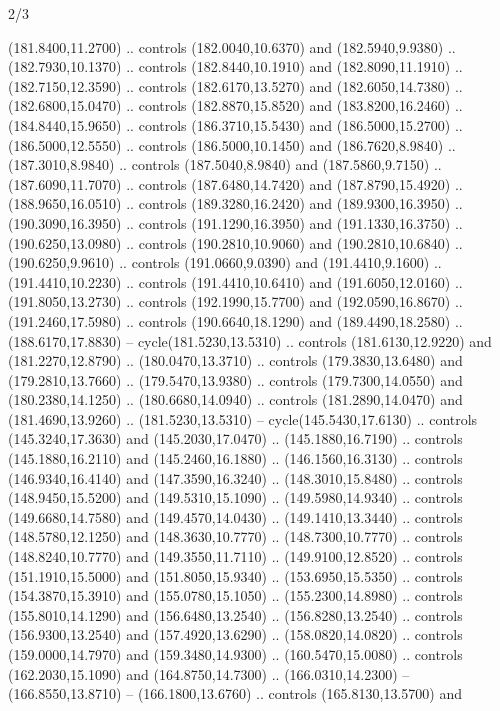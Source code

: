 \begin{flagdescription}{2/3}
\begin{scope}[xshift=0.5\flaglength,yshift=0.5\flagwidth,scale=\stretchfactor]
\begin{scope}[scale=0.001645\flagwidth,yshift=65mm,xshift=-63mm]
\begin{scope}[y=0.80pt, x=0.80pt, yscale=-1,]
\begin{scope}[cm={{1.33333,0.0,0.0,1.33333,(0.0,1e-05)}}]
  (181.8400,11.2700) .. controls (182.0040,10.6370) and (182.5940,9.9380) ..
  (182.7930,10.1370) .. controls (182.8440,10.1910) and (182.8090,11.1910) ..
  (182.7150,12.3590) .. controls (182.6170,13.5270) and (182.6050,14.7380) ..
  (182.6800,15.0470) .. controls (182.8870,15.8520) and (183.8200,16.2460) ..
  (184.8440,15.9650) .. controls (186.3710,15.5430) and (186.5000,15.2700) ..
  (186.5000,12.5550) .. controls (186.5000,10.1450) and (186.7620,8.9840) ..
  (187.3010,8.9840) .. controls (187.5040,8.9840) and (187.5860,9.7150) ..
  (187.6090,11.7070) .. controls (187.6480,14.7420) and (187.8790,15.4920) ..
  (188.9650,16.0510) .. controls (189.3280,16.2420) and (189.9300,16.3950) ..
  (190.3090,16.3950) .. controls (191.1290,16.3950) and (191.1330,16.3750) ..
  (190.6250,13.0980) .. controls (190.2810,10.9060) and (190.2810,10.6840) ..
  (190.6250,9.9610) .. controls (191.0660,9.0390) and (191.4410,9.1600) ..
  (191.4410,10.2230) .. controls (191.4410,10.6410) and (191.6050,12.0160) ..
  (191.8050,13.2730) .. controls (192.1990,15.7700) and (192.0590,16.8670) ..
  (191.2460,17.5980) .. controls (190.6640,18.1290) and (189.4490,18.2580) ..
  (188.6170,17.8830) -- cycle(181.5230,13.5310) .. controls (181.6130,12.9220)
  and (181.2270,12.8790) .. (180.0470,13.3710) .. controls (179.3830,13.6480)
  and (179.2810,13.7660) .. (179.5470,13.9380) .. controls (179.7300,14.0550)
  and (180.2380,14.1250) .. (180.6680,14.0940) .. controls (181.2890,14.0470)
  and (181.4690,13.9260) .. (181.5230,13.5310) -- cycle(145.5430,17.6130) ..
  controls (145.3240,17.3630) and (145.2030,17.0470) .. (145.1880,16.7190) ..
  controls (145.1880,16.2110) and (145.2460,16.1880) .. (146.1560,16.3130) ..
  controls (146.9340,16.4140) and (147.3590,16.3240) .. (148.3010,15.8480) ..
  controls (148.9450,15.5200) and (149.5310,15.1090) .. (149.5980,14.9340) ..
  controls (149.6680,14.7580) and (149.4570,14.0430) .. (149.1410,13.3440) ..
  controls (148.5780,12.1250) and (148.3630,10.7770) .. (148.7300,10.7770) ..
  controls (148.8240,10.7770) and (149.3550,11.7110) .. (149.9100,12.8520) ..
  controls (151.1910,15.5000) and (151.8050,15.9340) .. (153.6950,15.5350) ..
  controls (154.3870,15.3910) and (155.0780,15.1050) .. (155.2300,14.8980) ..
  controls (155.8010,14.1290) and (156.6480,13.2540) .. (156.8280,13.2540) ..
  controls (156.9300,13.2540) and (157.4920,13.6290) .. (158.0820,14.0820) ..
  controls (159.0000,14.7970) and (159.3480,14.9300) .. (160.5470,15.0080) ..
  controls (162.2030,15.1090) and (164.8750,14.7300) .. (166.0310,14.2300) --
  (166.8550,13.8710) -- (166.1800,13.6760) .. controls (165.8130,13.5700) and

\end{scope}
\end{scope}
\end{scope}
\end{scope}
\end{flagdescription}
